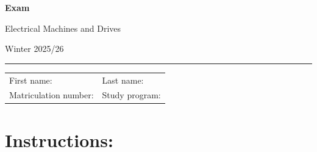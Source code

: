 \begin{center}

	{\vspace{3mm}\Large \textbf{
			\textsf{Exam}}
		\vspace{3mm}

		\LARGE
		\textsf{Electrical Machines and Drives}

		\vspace{6mm}
		\large

		Winter 2025/26
		\vspace{5mm}
	}

\end{center}

\hrule

\vspace{5mm}

\begin{flushleft}
	\begin{tabular}{ll}
		First name:  \qquad \qquad \qquad  \qquad \qquad\qquad \qquad \qquad & Last name:     \\[1cm]
		Matriculation number:                                                & Study program:
	\end{tabular}
\end{flushleft}

\section*{\hspace*{2mm}Instructions:}

